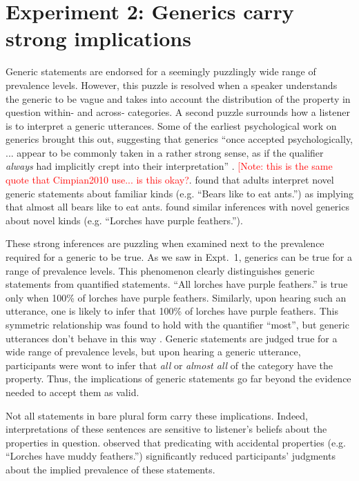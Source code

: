 \documentclass[10pt,letterpaper]{article}
\newcommand{\red}[1]{\textcolor{Red}{#1}}
\begin{document}
\section{Experiment 2: Generics carry strong implications}

Generic statements are endorsed for a seemingly puzzlingly wide range of prevalence levels. 
However, this puzzle is resolved when a speaker understands the generic to be vague and takes into account the distribution of the property in question within- and across- categories. 
A second puzzle surrounds how a listener is to interpret a generic utterances.
Some of the earliest psychological work on generics brought this out, suggesting that generics ``once accepted psychologically, ... appear to be commonly taken in a rather strong sense, as if the qualifier \emph{always} had implicitly crept into their interpretation'' \cite{Abelson1966}. \red{[Note: this is the same quote that Cimpian2010 use... is this okay?}.
%
 found that adults interpret novel generic statements about familiar kinds (e.g. ``Bears like to eat ants.'') as implying that almost all bears like to eat ants.
 found similar inferences with novel generics about novel kinds (e.g. ``Lorches have purple feathers.''). 

These strong inferences are puzzling when examined next to the prevalence required for a generic to be true. 
As we saw in Expt.~1, generics can be true for a range of prevalence levels. 
This phenomenon clearly distinguishes generic statements from quantified statements.
``All lorches have purple feathers.'' is true only when 100\% of lorches have purple feathers. 
Similarly, upon hearing such an utterance, one is likely to infer that 100\% of lorches have purple feathers.  
This symmetric relationship was found to hold with the quantifier ``most'', but generic utterances don't behave in this way .
Generic statements are judged true for a wide range of prevalence levels, but upon hearing a generic utterance, participants were wont to infer that \emph{all} or \emph{almost all} of the category have the property. 
Thus, the implications of generic statements go far beyond the evidence needed to accept them as valid.

Not all statements in bare plural form carry these implications. 
Indeed, interpretations of these sentences are sensitive to listener's beliefs about the properties in question. 
 observed that predicating with accidental properties (e.g. ``Lorches have muddy feathers.'') significantly reduced participants' judgments about the implied prevalence of these statements.
\end{document}
